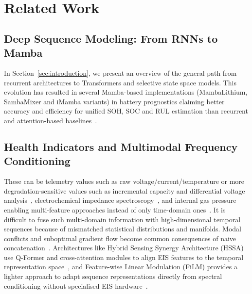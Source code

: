 \section{Related Work}
\label{sec:related}

\subsection{Deep Sequence Modeling: From RNNs to Mamba}
\label{subsec:related-sequence}

In Section~\ref{sec:introduction}, we present an overview of the general path
from recurrent architectures to Transformers and selective state space models.
This evolution has resulted in several Mamba-based implementations
(MambaLithium, SambaMixer and iMamba variants) in battery prognostics claiming
better accuracy and efficiency for unified SOH, SOC and RUL estimation than
recurrent and attention-based baselines~\cite{huang2025,olalde2024}.

\subsection{Health Indicators and Multimodal Frequency Conditioning}
\label{subsec:related-indicators}

These can be telemetry values such as raw voltage/current/temperature or more
degradation-sensitive values such as incremental capacity and differential
voltage analysis~\cite{su2024}, electrochemical impedance
spectroscopy~\cite{alsmadi2025}, and internal gas pressure~\cite{wang2025}
enabling multi-feature approaches instead of only time-domain
ones~\cite{yang2023}. It is difficult to fuse such multi-domain information with
high-dimensional temporal sequences because of mismatched statistical
distributions and manifolds. Modal conflicts and suboptimal gradient flow become
common consequences of naive concatenation~\cite{meng2026}. Architectures like
Hybrid Sensing Synergy Architecture (HSSA) use Q-Former and cross-attention
modules to align EIS features to the temporal representation
space~\cite{meng2026}, and Feature-wise Linear Modulation (FiLM) provides a
lighter approach to adapt sequence representations directly from spectral
conditioning without specialised EIS hardware~\cite{huang2025}.

